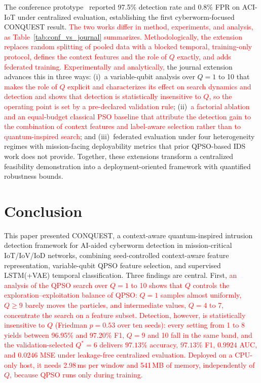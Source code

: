 \documentclass[conference]{IEEEtran}
\begin{document}
The conference prototype~\cite{ajakweconquest} reported
97.5\% detection rate and 0.8\% FPR on ACI-IoT under
centralized evaluation, establishing the first
cyberworm-focused CONQUEST result. \textcolor{red}{The
two works differ in method, experiments, and analysis,
as Table~\ref{tab:conf_vs_journal} summarizes. Methodologically, the extension
replaces random splitting of pooled data with a blocked temporal,
training-only protocol, defines the context features and the role
of $Q$ exactly, and adds federated training. Experimentally and
analytically,} the journal extension
advances this in three ways: (i)~a
variable-qubit analysis over $Q=1$ to 10
that \textcolor{red}{makes the role of $Q$ explicit and
characterizes its effect on search dynamics and detection}
\textcolor{red}{and shows that detection is statistically
insensitive to $Q$, so the operating point is set by a pre-declared
validation rule}; (ii)~\textcolor{red}{a factorial ablation
and an equal-budget classical PSO baseline that attribute the
detection gain to the combination of context features and
label-aware selection rather than to quantum-inspired search};
and (iii)~federated
evaluation under four heterogeneity regimes with
mission-facing deployability metrics that prior
QPSO-based IDS work does not provide. Together, these
extensions transform a centralized feasibility demonstration
into a deployment-oriented framework with quantified
robustness bounds.





\section{Conclusion}
\label{sec:conclusion}

This paper presented CONQUEST, a context-aware
quantum-inspired intrusion detection framework for AI-aided
cyberworm detection in mission-critical IoT/IoV/IoD networks,
combining seed-controlled context-aware feature representation,
variable-qubit QPSO feature selection, and supervised
LSTM(+VAE) temporal classification.
Three findings are central. First, \textcolor{red}{an
analysis of the QPSO search over $Q=1$ to 10 shows that $Q$ controls
the exploration--exploitation balance of QPSO: $Q=1$ samples almost
uniformly, $Q\ge9$ barely moves the particles, and intermediate
values, $Q=4$ to 7, concentrate the search on a feature subset.}
\textcolor{red}{Detection, however, is statistically insensitive to
$Q$ (Friedman $p=0.53$ over ten seeds): every setting from 1 to 8
yields between 96.95\% and 97.20\% F1, $Q=9$ and 10 fall in the same
band, and the validation-selected $Q^{*}=6$
delivers $97.13\%$ accuracy, $97.13\%$ F1, $0.9924$ AUC, and
$0.0246$ MSE under leakage-free centralized evaluation.} \textcolor{red}{Deployed
on a CPU-only host, it needs 2.98\,ms per window and 541\,MB of
memory, independently of $Q$, because QPSO runs only during
training.}
\end{document}
